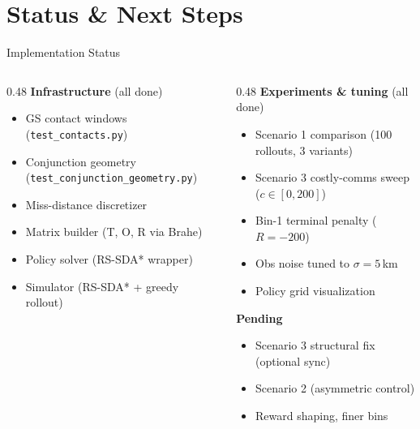 \documentclass[aspectratio=169]{beamer}
\newcommand{\good}[1]{\textcolor{green!60!black}{#1}}
\begin{document}
\section{Status \& Next Steps}

\begin{frame}{Implementation Status}
  \begin{columns}
    \begin{column}{0.48\textwidth}
      \textbf{Infrastructure} \good{(all done)}
      \begin{itemize}\small
        \item GS contact windows (\texttt{test\_contacts.py})
        \item Conjunction geometry (\texttt{test\_conjunction\_geometry.py})
        \item Miss-distance discretizer
        \item Matrix builder (T, O, R via Brahe)
        \item Policy solver (RS-SDA* wrapper)
        \item Simulator (RS-SDA* + greedy rollout)
      \end{itemize}
    \end{column}
    \begin{column}{0.48\textwidth}
      \textbf{Experiments \& tuning} \good{(all done)}
      \begin{itemize}\small
        \item Scenario 1 comparison (100 rollouts, 3 variants)
        \item Scenario 3 costly-comms sweep ($c \in [0,200]$)
        \item Bin-1 terminal penalty ($R=-200$)
        \item Obs noise tuned to $\sigma=5$\,km
        \item Policy grid visualization
      \end{itemize}
      \vspace{0.5em}
      \textbf{Pending}
      \begin{itemize}\small
        \item Scenario 3 structural fix (optional sync)
        \item Scenario 2 (asymmetric control)
        \item Reward shaping, finer bins
      \end{itemize}
    \end{column}
  \end{columns}
\end{frame}
\end{document}
